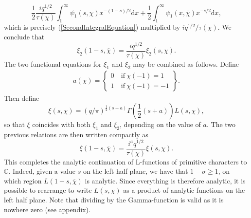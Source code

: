 \begin{equation}
    \frac12 \frac{i q^{1/2}}{\tau(\chi)}\int_{1}^{\infty}\psi_1(s, \chi) x^{-(1 - s)/2} \mathrm{d} x + \frac12 \int_{1}^{\infty} \psi_1(x, \overline{\chi})x^{-s/2} \mathrm{d} x, \nonumber
\end{equation}
which is precisely (\ref{SecondIntegralEquation}) multiplied by $i q^{1/2}/\tau(\chi)$. We conclude that
\begin{equation}
    \xi_{2}(1-s, \overline{\chi}) = \frac{i q^{1/2}}{\tau(\chi)} \xi_{2}(s, \chi). \nonumber
\end{equation}
The two functional equations for $\xi_1$ and $\xi_2$ may be combined as follows. Define 
\begin{align}
a(\chi) = \left\{
    \begin{array}{cc}
        0 & \ \textrm{if} \ \chi(-1) = 1\\
        1 & \ \textrm{if} \ \chi(-1) = -1
    \end{array}
    \right\}.
    \nonumber
\end{align}
Then define 
\begin{equation}
    \xi(s, \chi) = (q/\pi)^{\frac12(s + a)} \Gamma\left(\frac12 (s + a) \right) L(s, \chi), \nonumber
\end{equation}
so that $\xi$ coincides with both $\xi_1$ and $\xi_2$, depending on the value of $a$. The two previous relations are then written compactly as
\begin{equation}
    \xi(1-s, \overline{\chi}) =  \frac{i^{a}q^{1/2}}{\tau(\chi)} \xi(s, \chi). \nonumber
\end{equation}
This completes the analytic continuation of L-functions of primitive characters to $\mathbb{C}$. Indeed, given a value $s$ on the left half plane, we have that $1-\sigma \geq 1$, on which region $L(1-s, \overline{\chi})$ is analytic. Since everything is therefore analytic, it is possible to rearrange to write $L(s, \chi)$ as a product of analytic functions on the left half plane. Note that dividing by the Gamma-function is valid as it is nowhere zero (see appendix). \\

